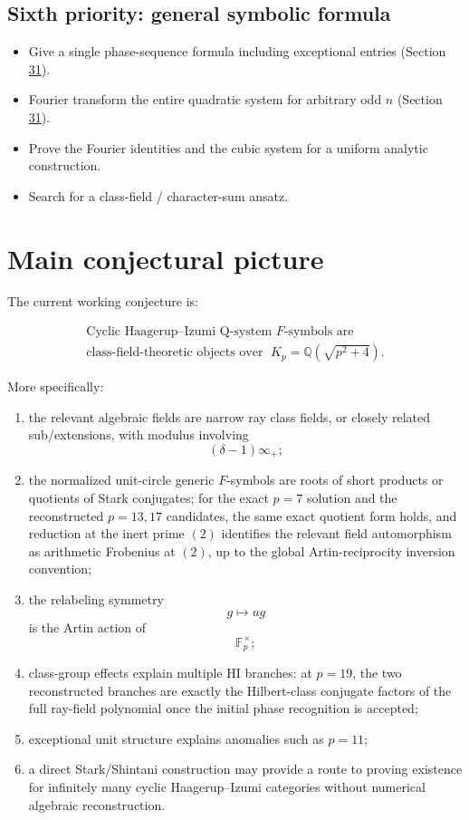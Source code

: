 \documentclass[11pt,reqno]{amsart}
\theoremstyle{plain}
\begin{document}
\subsection{Sixth priority: general symbolic formula}\label{sec:18.6}

\begin{itemize}
\item[$\boxtimes$] Give a single phase-sequence formula including exceptional entries (Section \hyperref[sec:31]{31}).
\item[$\boxtimes$] Fourier transform the entire quadratic system for arbitrary odd \(n\) (Section \hyperref[sec:31]{31}).
\item[$\square$] Prove the Fourier identities and the cubic system for a uniform analytic construction.
\item[$\square$] Search for a class-field / character-sum ansatz.
\end{itemize}

\section{Main conjectural picture}\label{sec:19}

The current working conjecture is:

\[
\boxed{
\begin{gathered}
\text{Cyclic Haagerup--Izumi Q-system \(F\)-symbols are}\\
\text{class-field-theoretic objects over }\;K_p=\mathbb Q(\sqrt{p^2+4}).
\end{gathered}
}
\]

More specifically:

\begin{enumerate}
\item the relevant algebraic fields are narrow ray class fields, or closely related sub/extensions, with modulus involving
\[
 (\delta-1)\infty_+;
\]
\item the normalized unit-circle generic \(F\)-symbols are roots of short products or quotients of Stark conjugates; for the exact \(p=7\) solution and the reconstructed \(p=13,17\) candidates, the same exact quotient form holds, and reduction at the inert prime \((2)\) identifies the relevant field automorphism as arithmetic Frobenius at \((2)\), up to the global Artin-reciprocity inversion convention;
\item the relabeling symmetry
\[
 g\mapsto ug
\]
is the Artin action of
\[
 \mathbb F_p^\times;
\]
\item class-group effects explain multiple HI branches: at \(p=19\), the two reconstructed branches are exactly the Hilbert-class conjugate factors of the full ray-field polynomial once the initial phase recognition is accepted;
\item exceptional unit structure explains anomalies such as \(p=11\);
\item a direct Stark/Shintani construction may provide a route to proving existence for infinitely many cyclic Haagerup--Izumi categories without numerical algebraic reconstruction.
\end{enumerate}
\end{document}
